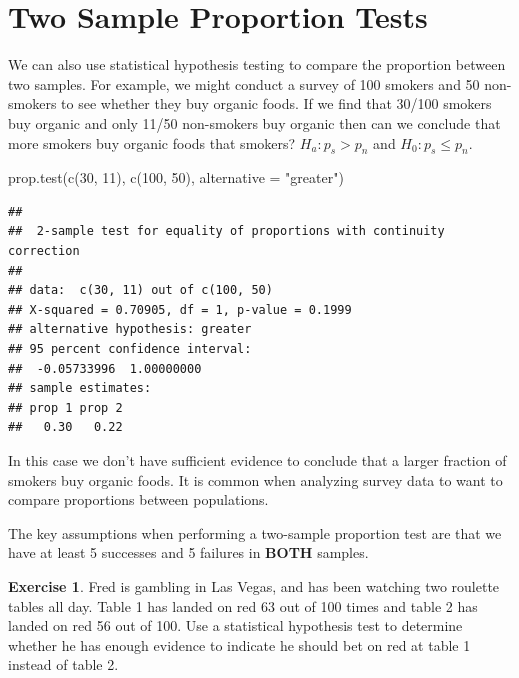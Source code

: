 \documentclass[
]{book}
\newenvironment{Shaded}{\begin{snugshade}}{\end{snugshade}}
\newcommand{\AttributeTok}[1]{\textcolor[rgb]{0.77,0.63,0.00}{#1}}
\newcommand{\DecValTok}[1]{\textcolor[rgb]{0.00,0.00,0.81}{#1}}
\newcommand{\FunctionTok}[1]{\textcolor[rgb]{0.00,0.00,0.00}{#1}}
\newcommand{\NormalTok}[1]{#1}
\newcommand{\StringTok}[1]{\textcolor[rgb]{0.31,0.60,0.02}{#1}}
\theoremstyle{definition}
\theoremstyle{definition}
\theoremstyle{definition}
\newtheorem{exercise}{Exercise}[chapter]
\theoremstyle{definition}
\theoremstyle{remark}
\begin{document}
\hypertarget{two-sample-proportion-tests}{%
\section{Two Sample Proportion Tests}\label{two-sample-proportion-tests}}

We can also use statistical hypothesis testing to compare the proportion between two samples. For example, we might conduct a survey of 100 smokers and 50 non-smokers to see whether they buy organic foods. If we find that 30/100 smokers buy organic and only 11/50 non-smokers buy organic then can we conclude that more smokers buy organic foods that smokers? \(H_a: p_s > p_n\) and \(H_0: p_s \leq p_n\).

\begin{Shaded}
\begin{Highlighting}[]
\FunctionTok{prop.test}\NormalTok{(}\FunctionTok{c}\NormalTok{(}\DecValTok{30}\NormalTok{, }\DecValTok{11}\NormalTok{), }\FunctionTok{c}\NormalTok{(}\DecValTok{100}\NormalTok{, }\DecValTok{50}\NormalTok{), }\AttributeTok{alternative =} \StringTok{"greater"}\NormalTok{)}
\end{Highlighting}
\end{Shaded}

\begin{verbatim}
## 
##  2-sample test for equality of proportions with continuity correction
## 
## data:  c(30, 11) out of c(100, 50)
## X-squared = 0.70905, df = 1, p-value = 0.1999
## alternative hypothesis: greater
## 95 percent confidence interval:
##  -0.05733996  1.00000000
## sample estimates:
## prop 1 prop 2 
##   0.30   0.22
\end{verbatim}

In this case we don't have sufficient evidence to conclude that a larger fraction of smokers buy organic foods. It is common when analyzing survey data to want to compare proportions between populations.

The key assumptions when performing a two-sample proportion test are that we have at least 5 successes and 5 failures in \textbf{BOTH} samples.

\begin{exercise}
\protect\hypertarget{exr:unnamed-chunk-563}{}\label{exr:unnamed-chunk-563}Fred is gambling in Las Vegas, and has been watching two roulette tables all day. Table 1 has landed on red 63 out of 100 times and table 2 has landed on red 56 out of 100. Use a statistical hypothesis test to determine whether he has enough evidence to indicate he should bet on red at table 1 instead of table 2.
\end{exercise}
\end{document}
